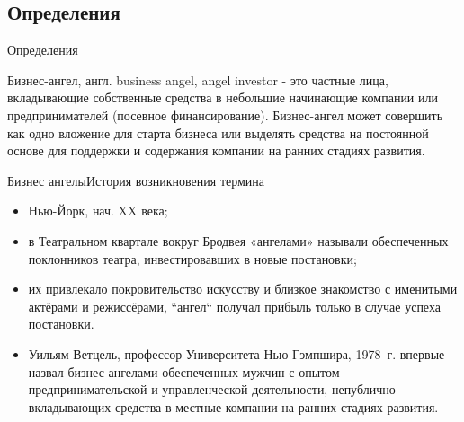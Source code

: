 \documentclass[_Venture_p2.tex]{subfiles}
\begin{document}

\subsection{Определения}
\begin{frame}{Определения}
\begin{block}{Бизнес-ангел, англ. business angel, angel investor}
\quad
- это частные лица, вкладывающие собственные средства в небольшие начинающие компании или предпринимателей (посевное финансирование). Бизнес-ангел может совершить как одно вложение для старта бизнеса или выделять средства на постоянной основе для поддержки и содержания компании на ранних стадиях развития.
\end{block}
\end{frame}

\begin{frame}[allowframebreaks]{Бизнес ангелы}{История возникновения термина }
\begin{itemize}
	\item Нью-Йорк, нач. XX века;
	\item в Театральном квартале вокруг Бродвея «ангелами» называли обеспеченных поклонников театра, инвестировавших в новые постановки;	
	\item их привлекало покровительство искусству и близкое знакомство с именитыми актёрами и режиссёрами, ``ангел`` получал прибыль только в случае успеха постановки.
	
	\pagebreak
	\item Уильям Ветцель, профессор Университета Нью-Гэмпшира, 1978~г. впервые назвал бизнес-ангелами обеспеченных мужчин с опытом предпринимательской и управленческой деятельности, непублично вкладывающих средства в местные компании на ранних стадиях развития.	
\end{itemize}
\end{frame}
\end{document}
